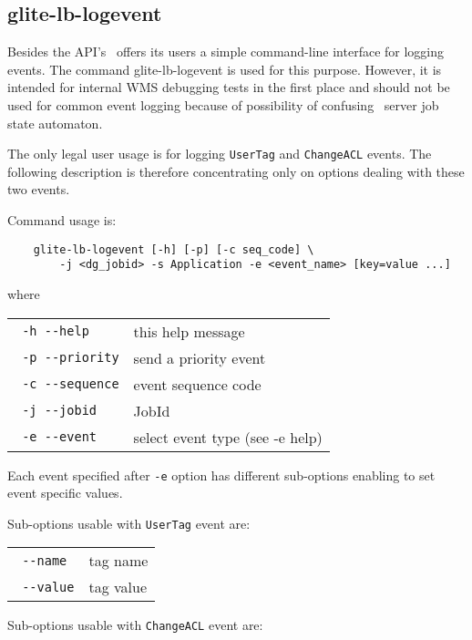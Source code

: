 \subsection{glite-lb-logevent}
\label{glite-lb-logevent}

Besides the API's \LB\ offers its users a simple command-line interface for
logging events. The command glite-lb-logevent is used for this purpose. However, it
is intended for internal WMS debugging tests in the first place and should not
be used for common event logging because of possibility of confusing \LB\
server job state automaton.

The only legal user usage is for logging \verb'UserTag' and \verb'ChangeACL' events. The following description is therefore concentrating only on options dealing with these two events.

Command usage is:

\begin{verbatim}
    glite-lb-logevent [-h] [-p] [-c seq_code] \
        -j <dg_jobid> -s Application -e <event_name> [key=value ...]
\end{verbatim}

where

\begin{tabularx}{\textwidth}{lX}
\texttt{  -h  -{}-help} &           this help message\\
\texttt{  -p  -{}-priority} &       send a priority event\\
\texttt{  -c  -{}-sequence} &       event sequence code\\
\texttt{  -j  -{}-jobid} &          JobId\\
\texttt{  -e  -{}-event} &           select event type (see -e help)\\
\end{tabularx}

\medskip

Each event specified after \verb'-e' option has different sub-options enabling to set event specific values.

Sub-options usable with \verb'UserTag' event are:


\begin{tabularx}{\textwidth}{lX}
\texttt{      -{}-name}  &          tag name\\
\texttt{      -{}-value} &          tag value\\
\end{tabularx}

\medskip

Sub-options usable with \verb'ChangeACL' event are:

